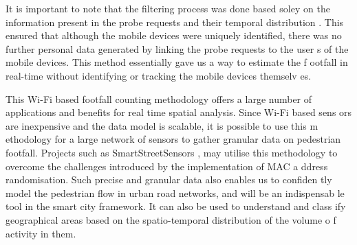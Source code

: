 \documentclass[11t, a4paper, twocolumn]{article}
\begin{document}
	It is important to note that the filtering process was done based soley 
on the information present in the probe requests and their temporal distribution
. This ensured that although the mobile devices were uniquely identified, there 
was no further personal data generated by linking the probe requests to the user
s of the mobile devices. This method essentially gave us a way to estimate the f
ootfall in real-time without identifying or tracking the mobile devices themselv
es.

	This Wi-Fi based footfall counting methodology offers a large number of 
applications and benefits for real time spatial analysis. Since Wi-Fi based sens
ors are inexpensive and the data model is scalable, it is possible to use this m
ethodology for a large network of sensors to gather granular data on pedestrian 
footfall. Projects such as SmartStreetSensors \citep{sss2016}, may utilise this 
methodology to overcome the challenges introduced by the implementation of MAC a
ddress randomisation. Such precise and granular data also enables us to confiden
tly model the pedestrian flow in urban road networks, and will be an indispensab
le tool in the smart city framework. It can also be used to understand and class
ify geographical areas based on the spatio-temporal distribution of the volume o
f activity in them.

	\printbibliography[title={References}]
\end{document}
